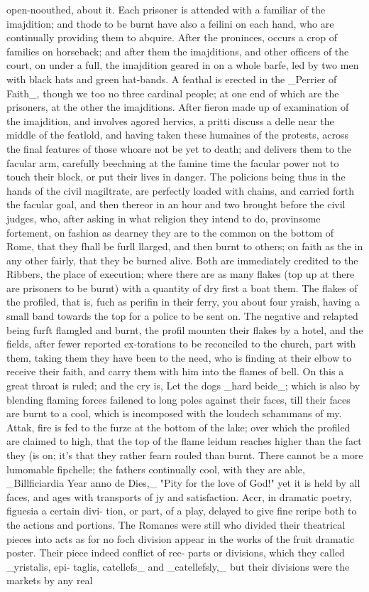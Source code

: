 \documentclass{article}
\begin{document}
open-noouthed, about it. Each prisoner is attended with a familiar of the imajdition; and thode to be burnt have also a feilini on each hand, who are continually providing them to abquire. After the proninces, occurs a crop of families on horseback; and after them the imajditions, and other officers of the court, on under a full, the imajdition geared in on a whole barfe, led by two men with black hats and green hat-bands. A feathal is erected in the \_Perrier of Faith\_, though we too no three cardinal people; at one end of which are the prisoners, at the other the imajditions. After fieron made up of examination of the imajdition, and involves agored hervics, a pritti discuss a delle near the middle of the featlold, and having taken these humaines of the protests, across the final features of those whoare not be yet to death; and delivers them to the facular arm, carefully beechning at the famine time the facular power not to touch their block, or put their lives in danger. The policions being thus in the hands of the civil magiltrate, are perfectly loaded with chains, and carried forth the facular goal, and then thereor in an hour and two brought before the civil judges, who, after asking in what religion they intend to do, provinsome fortement, on fashion as dearney they are to the common on the bottom of Rome, that they fhall be furll llarged, and then burnt to others; on faith as the in any other fairly, that they be burned alive. Both are immediately credited to the Ribbers, the place of execution; where there are as many flakes (top up at there are prisoners to be burnt) with a quantity of dry first a boat them. The flakes of the profiled, that is, fuch as perifin in their ferry, you about four yraish, having a small band towards the top for a police to be sent on. The negative and relapted being furft flamgled and burnt, the profil mounten their flakes by a hotel, and the fields, after fewer reported ex-torations to be reconciled to the church, part with them, taking them they have been to the need, who is finding at their elbow to receive their faith, and carry them with him into the flames of bell. On this a great throat is ruled; and the cry is, Let the dogs \_hard beide\_; which is also by blending flaming forces failened to long poles against their faces, till their faces are burnt to a cool, which is incomposed with the loudech schammans of my. Attak, fire is fed to the furze at the bottom of the lake; over which the profiled are claimed to high, that the top of the flame leidum reaches higher than the fact they (is on; it’s that they rather fearn rouled than burnt. There cannot be a more lumomable fipchelle; the fathers continually cool, with they are able, \_Billficiardia Year anno de Dies,\_ "Pity for the love of God!" yet it is held by all faces, and ages with transports of jy and satisfaction. Accr, in dramatic poetry, figuesia a certain divi- tion, or part, of a play, delayed to give fine reripe both to the actions and portions. The Romanes were still who divided their theatrical pieces into acts as for no foch division appear in the works of the fruit dramatic poster. Their piece indeed conflict of rec- parts or divisions, which they called \_yristalis, epi- taglis, catellefs\_ and \_catellefsly,\_ but their divisions were the markets by any real 
\end{document}
